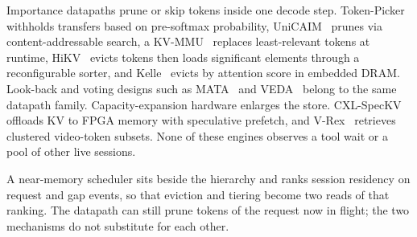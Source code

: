 Importance datapaths prune or skip tokens inside one decode step.
Token-Picker~\cite{park_tokenpicker_2024} withholds transfers based on
pre-softmax probability, UniCAIM~\cite{xu_unicaim_2025} prunes via
content-addressable search, a KV-MMU~\cite{moradifirouzabadi_kvmmu_2025}
replaces least-relevant tokens at runtime,
HiKV~\cite{fang_hikv_2026} evicts tokens then loads significant
elements through a reconfigurable sorter, and
Kelle~\cite{xia_kelle_2025} evicts by attention score in embedded DRAM.
Look-back and voting designs such as MATA~\cite{zhu_mata_2026} and
VEDA~\cite{wang_veda_2025} belong to the same datapath family.
Capacity-expansion hardware enlarges the store.
CXL-SpecKV~\cite{liu_cxlspeckv_2026} offloads KV to FPGA memory
with speculative prefetch, and V-Rex~\cite{kim_vrex_2026} retrieves
clustered video-token subsets. None of these engines observes a tool
wait or a pool of other live sessions.

A near-memory scheduler sits beside the hierarchy and ranks session
residency on request and gap events, so that eviction and tiering
become two reads of that ranking. The datapath can still prune tokens
of the request now in flight; the two mechanisms do not substitute for
each other.
